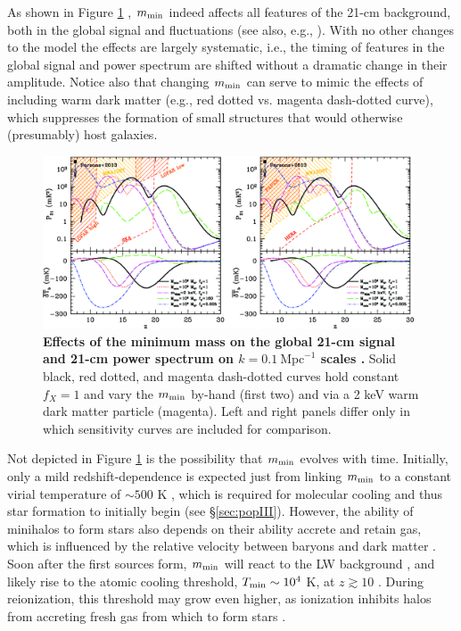 As shown in Figure \ref{fig:mesinger2014_fig3} \cite{Mesinger2014}, $m_{\text{min}}$ indeed affects all features of the 21-cm background, both in the global signal and fluctuations (see also, e.g., \cite{Fialkov2017,Mirocha2015}). With no other changes to the model the effects are largely systematic, i.e., the timing of features in the global signal and power spectrum are shifted without a dramatic change in their amplitude. Notice also that changing $m_{\text{min}}$ can serve to mimic the effects of including warm dark matter (e.g., red dotted vs. magenta dash-dotted curve), which suppresses the formation of small structures that would otherwise (presumably) host galaxies.

\begin{figure}[]
\begin{center}
\includegraphics[width=0.98\textwidth]{Mirocha/mesinger2014_fig3.pdf}
\end{center}
\caption{{\bf Effects of the minimum mass on the global 21-cm signal and 21-cm power spectrum on $k=0.1 \ \mathrm{Mpc}^{-1}$ scales \cite{Mesinger2014}.} Solid black, red dotted, and magenta dash-dotted curves hold constant $f_X=1$ and vary the $m_{\text{min}}$ by-hand (first two) and via a 2 keV warm dark matter particle (magenta). Left and right panels differ only in which sensitivity curves are included for comparison.}
\label{fig:mesinger2014_fig3}
\end{figure}

Not depicted in Figure \ref{fig:mesinger2014_fig3} is the possibility that $m_{\text{min}}$ evolves with time. Initially, only a mild redshift-dependence is expected just from linking $m_{\text{min}}$ to a constant virial temperature of $\sim 500$ K \cite{Tegmark1997}, which is required for molecular cooling and thus star formation to initially begin (see \S\ref{sec:popIII}). However, the ability of minihalos to form stars also depends on their ability accrete and retain gas, which is influenced by the relative velocity between baryons and dark matter \cite{Tseliakhovich2010,Tseliakhovich2011,Fialkov2012}. Soon after the first sources form, $m_{\text{min}}$ will react to the LW background \cite{Haiman1997,Machacek2001,Visbal2014}, and likely rise to the atomic cooling threshold, $T_{\min} \sim 10^4$ K, at $z \gtrsim 10$ \cite{Trenti2009,Mebane2018}. During reionization, this threshold may grow even higher, as ionization inhibits halos from accreting fresh gas from which to form stars \cite{Gnedin2000,Noh2014,Yue2016}.


